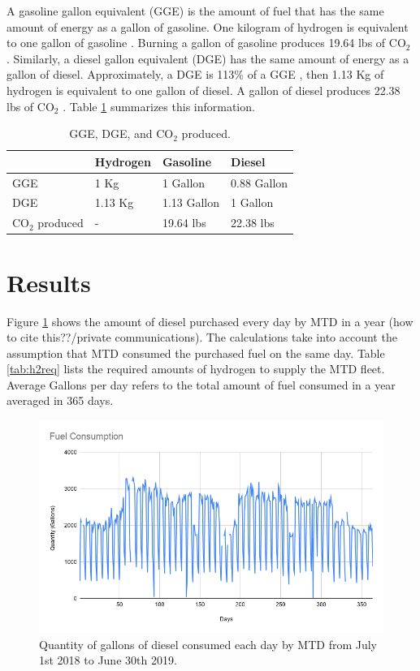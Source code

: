 \documentclass{anstrans}
\begin{document}
A gasoline gallon equivalent (GGE) is the amount of fuel that has the same amount of energy as a gallon of gasoline. One kilogram of hydrogen is equivalent to one gallon of gasoline \cite{noauthor_hydrogen_nodate}. Burning a gallon of gasoline produces 19.64 lbs of CO$_2$ \cite{noauthor_how_2014}. 
Similarly, a diesel gallon equivalent (DGE) has the same amount of energy as a gallon of diesel. Approximately, a DGE is 113\% of a GGE \cite{noauthor_fuel_2014}, then 1.13 Kg of hydrogen is equivalent to one gallon of diesel.
A gallon of diesel produces 22.38 lbs of CO$_2$ \cite{noauthor_how_2014}. 
Table \ref{tab:meth} summarizes this information.

\begin{table}[!h]
	\centering
    \caption{GGE, DGE, and CO$_2$ produced.}
    \label{tab:meth}
	\begin{tabular}{l|lll}
	\hline
	                 & Hydrogen & Gasoline    & Diesel      \\ \hline
	GGE              & 1 Kg     & 1 Gallon    & 0.88 Gallon \\
	DGE              & 1.13 Kg  & 1.13 Gallon & 1 Gallon    \\
    CO$_2$ produced  & -        & 19.64 lbs   & 22.38 lbs   \\ \hline

	\end{tabular}
\end{table}

\section{Results}

Figure \ref{fig:mtdfuel} shows the amount of diesel purchased every day by MTD in a year (how to cite this??/private communications). The calculations take into account the assumption that MTD consumed the purchased fuel on the same day.
Table \ref{tab:h2req} lists the required amounts of hydrogen to supply the MTD fleet. Average Gallons per day refers to the total amount of fuel consumed in a year averaged in 365 days. 

\begin{figure}[!h]
	\centering
	\includegraphics[width=1.05\linewidth]{figures/fuelconsumption.png}
	\hfill
	\caption{Quantity of gallons of diesel consumed each day by MTD from July 1st 2018 to June 30th 2019.}
	\label{fig:mtdfuel}
\end{figure}
\end{document}
